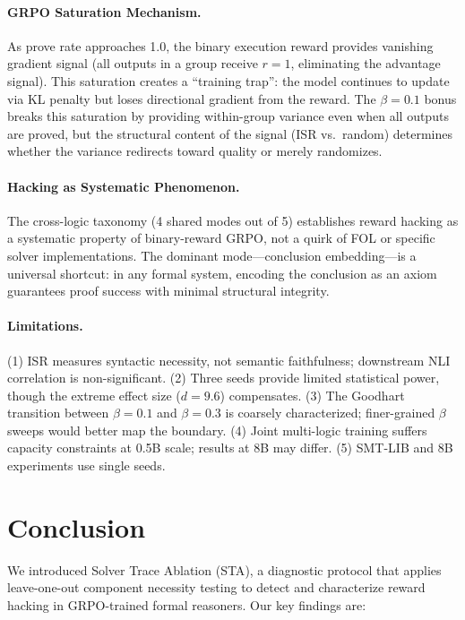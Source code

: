 \documentclass[11pt,twocolumn]{article}
\newcommand{\isr}{\textsc{ISR}}
\newcommand{\sta}{\textsc{STA}}
\newcommand{\grpo}{\textsc{GRPO}}
\begin{document}
\paragraph{GRPO Saturation Mechanism.}
As prove rate approaches 1.0, the binary execution reward provides vanishing gradient signal (all outputs in a group receive $r{=}1$, eliminating the advantage signal).
This saturation creates a ``training trap'': the model continues to update via KL penalty but loses directional gradient from the reward.
The $\beta{=}0.1$ bonus breaks this saturation by providing within-group variance even when all outputs are proved, but the structural content of the signal (ISR vs.\ random) determines whether the variance redirects toward quality or merely randomizes.

\paragraph{Hacking as Systematic Phenomenon.}
The cross-logic taxonomy (4 shared modes out of 5) establishes reward hacking as a systematic property of binary-reward \grpo{}, not a quirk of FOL or specific solver implementations.
The dominant mode---conclusion embedding---is a universal shortcut: in any formal system, encoding the conclusion as an axiom guarantees proof success with minimal structural integrity.

\paragraph{Limitations.}
(1) \isr{} measures syntactic necessity, not semantic faithfulness; downstream NLI correlation is non-significant.
(2) Three seeds provide limited statistical power, though the extreme effect size ($d{=}9.6$) compensates.
(3) The Goodhart transition between $\beta{=}0.1$ and $\beta{=}0.3$ is coarsely characterized; finer-grained $\beta$ sweeps would better map the boundary.
(4) Joint multi-logic training suffers capacity constraints at 0.5B scale; results at 8B may differ.
(5) SMT-LIB and 8B experiments use single seeds.

\section{Conclusion}
\label{sec:conclusion}

We introduced Solver Trace Ablation (\sta{}), a diagnostic protocol that applies leave-one-out component necessity testing to detect and characterize reward hacking in \grpo{}-trained formal reasoners.
Our key findings are:
\end{document}

